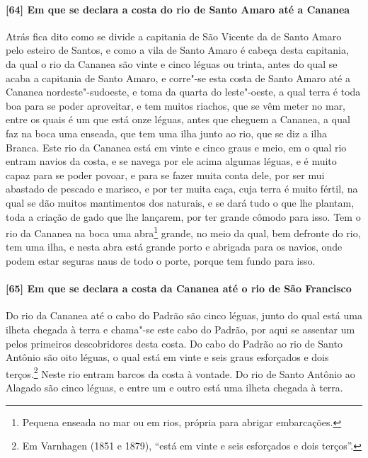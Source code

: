 \paragraph{[64] Em que se declara a costa do rio de Santo Amaro até a Cananea} \quad
Atrás fica dito como se divide a capitania de São Vicente da de Santo Amaro pelo esteiro
de Santos, e como a vila de Santo Amaro é cabeça desta capitania, da qual o rio da Cananea
são vinte e cinco léguas ou trinta, antes do qual se acaba a capitania de Santo Amaro, e
corre"-se esta costa de Santo Amaro até a Cananea nordeste"-sudoeste, e toma da quarta do
leste"-oeste, a qual terra é toda boa para se poder aproveitar, e tem muitos riachos, que
se vêm meter no mar, entre os quais é um que está onze léguas, antes que cheguem a
Cananea, a qual faz na boca uma enseada, que tem uma ilha junto ao rio, que se diz a ilha
Branca. Este rio da Cananea está em vinte e cinco graus e meio, em o qual rio entram
navios da costa, e se navega por ele acima algumas léguas, e é muito capaz para se poder
povoar, e para se fazer muita conta dele, por ser mui abastado de pescado e marisco, e por
ter muita caça, cuja terra é muito fértil, na qual se dão muitos mantimentos dos naturais,
e se dará tudo o que lhe plantam, toda a criação de gado que lhe lançarem, por ter grande
cômodo para isso. Tem o rio da Cananea na boca uma abra\footnote{ Pequena enseada no mar
ou em rios, própria para abrigar embarcações.} grande, no meio da qual, bem defronte do
rio, tem uma ilha, e nesta abra está grande porto e abrigada para os navios, onde podem
estar seguras naus de todo o porte, porque tem fundo para isso.

\paragraph{[65] Em que se declara a costa da Cananea até o rio de São Francisco} \quad
Do rio da Cananea até o cabo do Padrão são cinco léguas, junto do qual está uma ilheta
chegada à terra e chama"-se este cabo do Padrão, por aqui se assentar um pelos primeiros
descobridores desta costa. Do cabo do Padrão ao rio de Santo Antônio são oito léguas, o
qual está em vinte e seis graus esforçados e dois terços.\footnote{ Em Varnhagen (1851 e
1879), ``está em vinte e seis esforçados e dois terços''.} Neste rio entram barcos da
costa à vontade. Do rio de Santo Antônio ao Alagado são cinco léguas, e entre um e outro
está uma ilheta chegada à terra.

